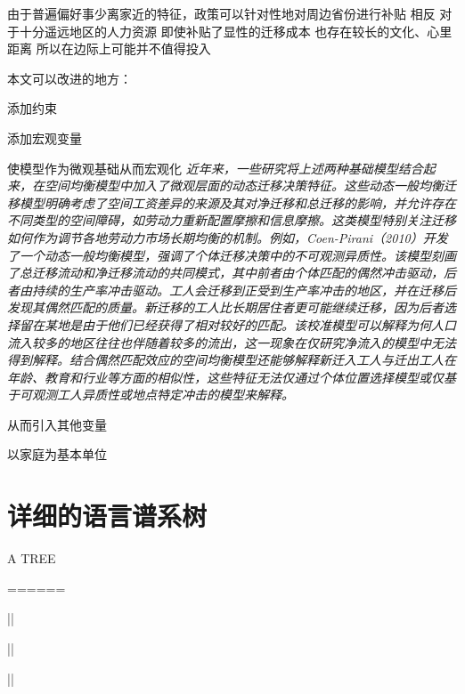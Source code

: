 \documentclass[
  a4paper,
  zihao=-4,
  fontset=mac,
  AutoFakeBold,
  AutoFakeSlant,
  oneside]{ctexbook}
\begin{document}
由于普遍偏好事少离家近的特征，政策可以针对性地对周边省份进行补贴
相反 对于十分遥远地区的人力资源 即使补贴了显性的迁移成本 也存在较长的文化、心里距离 所以在边际上可能并不值得投入



本文可以改进的地方：

添加约束

添加宏观变量

使模型作为微观基础从而宏观化
\textit{近年来，一些研究将上述两种基础模型结合起来，在空间均衡模型中加入了微观层面的动态迁移决策特征。这些动态一般均衡迁移模型明确考虑了空间工资差异的来源及其对净迁移和总迁移的影响，并允许存在不同类型的空间障碍，如劳动力重新配置摩擦和信息摩擦。这类模型特别关注迁移如何作为调节各地劳动力市场长期均衡的机制。例如，Coen-Pirani（2010）开发了一个动态一般均衡模型，强调了个体迁移决策中的不可观测异质性。该模型刻画了总迁移流动和净迁移流动的共同模式，其中前者由个体匹配的偶然冲击驱动，后者由持续的生产率冲击驱动。工人会迁移到正受到生产率冲击的地区，并在迁移后发现其偶然匹配的质量。新迁移的工人比长期居住者更可能继续迁移，因为后者选择留在某地是由于他们已经获得了相对较好的匹配。该校准模型可以解释为何人口流入较多的地区往往也伴随着较多的流出，这一现象在仅研究净流入的模型中无法得到解释。结合偶然匹配效应的空间均衡模型还能够解释新迁入工人与迁出工人在年龄、教育和行业等方面的相似性，这些特征无法仅通过个体位置选择模型或仅基于可观测工人异质性或地点特定冲击的模型来解释。}

从而引入其他变量

以家庭为基本单位


\newpage
\appendix

\chapter{详细的语言谱系树}

A TREE

======

      ||
      
      ||
      
      ||

\newpage
%
%
%
\printbibliography[heading=bibliography,title=参考文献]
\end{document}
